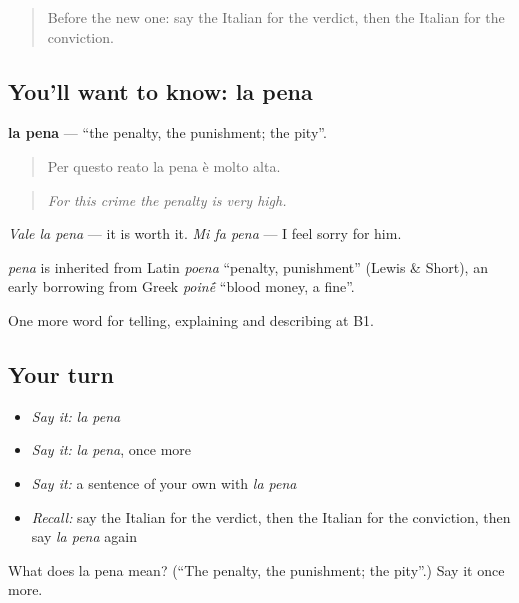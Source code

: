 \label{lesson:IT-C392-pena}



\begin{quote}
Before the new one: say the Italian for the verdict, then the Italian for the conviction.
\end{quote}

\subsection*{You'll want to know: la pena}
\textbf{la pena} — \textquotedblleft{}the penalty, the punishment; the pity\textquotedblright{}.

\begin{quote}
Per questo reato la pena è molto alta.
\end{quote}

\begin{quote}
\emph{For this crime the penalty is very high.}
\end{quote}

\emph{Vale la pena} — it is worth it. \emph{Mi fa pena} — I feel sorry for him.

\begin{cousinweb}
\emph{pena} is inherited from Latin \emph{poena} \textquotedblleft{}penalty, punishment\textquotedblright{} (Lewis \& Short), an early borrowing from Greek \emph{poin\'{\={e}}} \textquotedblleft{}blood money, a fine\textquotedblright{}.
\end{cousinweb}

\begin{grammarlens}[title={What you've built}]
One more word for telling, explaining and describing at B1.
\end{grammarlens}

\subsection*{Your turn}
\begin{itemize}
\raggedright
  \item \emph{Say it:} \emph{la pena}
  \item \emph{Say it:} \emph{la pena}, once more
  \item \emph{Say it:} a sentence of your own with \emph{la pena}
  \item \emph{Recall:} say the Italian for the verdict, then the Italian for the conviction, then say \emph{la pena} again
\end{itemize}

\begin{tcolorbox}[breakable,colback=teal!4,colframe=teal!35!black,title={Before you move on}]
What does la pena mean? (\textquotedblleft{}The penalty, the punishment; the pity\textquotedblright{}.) Say it once more.
\end{tcolorbox}
